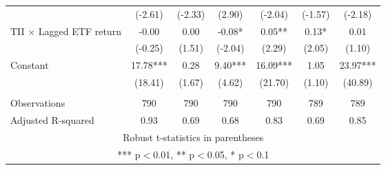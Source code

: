 \documentclass[]{article}
\begin{document}
\begin{tabular}{lcccccc}
 & (-2.61) & (-2.33) & (2.90) & (-2.04) & (-1.57) & (-2.18) \\
TII $\times$ Lagged ETF return & -0.00 & 0.00 & -0.08* & 0.05** & 0.13* & 0.01 \\
 & (-0.25) & (1.51) & (-2.04) & (2.29) & (2.05) & (1.10) \\
Constant & 17.78*** & 0.28 & 9.40*** & 16.09*** & 1.05 & 23.97*** \\
 & (18.41) & (1.67) & (4.62) & (21.70) & (1.10) & (40.89) \\
 &  &  &  &  &  &  \\
Observations & 790 & 790 & 790 & 790 & 789 & 789 \\
 Adjusted R-squared & 0.93 & 0.69 & 0.68 & 0.83 & 0.69 & 0.85 \\ \hline
\multicolumn{7}{c}{ Robust t-statistics in parentheses} \\
\multicolumn{7}{c}{ *** p$<$0.01, ** p$<$0.05, * p$<$0.1} \\
\end{tabular}
\end{document}
